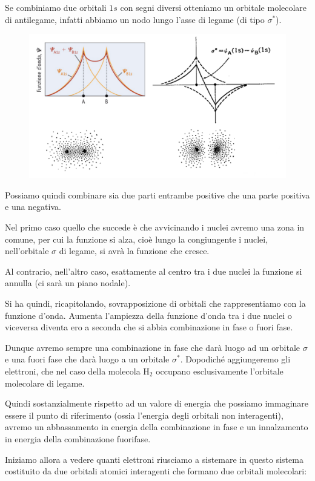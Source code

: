 Se combiniamo due orbitali $1s$ con segni diversi otteniamo un orbitale molecolare di antilegame, infatti abbiamo un nodo lungo l'asse di legame (di tipo $\sigma^*$).

\begin{figure}[htp]
    \centering
    \includegraphics[width=12cm]{immagini/combinazione_funzioni.png}
\end{figure}

Possiamo quindi combinare sia due parti entrambe positive che una parte positiva e una negativa.

Nel primo caso quello che succede è che avvicinando i nuclei avremo una zona in comune, per cui la funzione si alza, cioè lungo la congiungente i nuclei, nell'orbitale $\sigma$ di legame, si avrà la funzione che cresce.

Al contrario, nell'altro caso, esattamente al centro tra i due nuclei la funzione si annulla (ci sarà un piano nodale).

Si ha quindi, ricapitolando, sovrapposizione di orbitali che rappresentiamo con la funzione d'onda. Aumenta l'ampiezza della funzione d'onda tra i due nuclei o viceversa diventa ero a seconda che si abbia combinazione in fase o fuori fase.

Dunque avremo sempre una combinazione in fase che darà luogo ad un orbitale $\sigma$ e una fuori fase che darà luogo a un orbitale $\sigma^*$. Dopodiché aggiungeremo gli elettroni, che nel caso della molecola H$_2$ occupano esclusivamente l'orbitale molecolare di legame.

Quindi sostanzialmente rispetto ad un valore di energia che possiamo immaginare essere il punto di riferimento (ossia l'energia degli orbitali non interagenti), avremo un abbassamento in energia della combinazione in fase e un innalzamento in energia della combinazione fuorifase.

\vspace{0.2cm}Iniziamo allora a vedere quanti elettroni riusciamo a sistemare in questo sistema costituito da due orbitali atomici interagenti che formano due orbitali molecolari:

